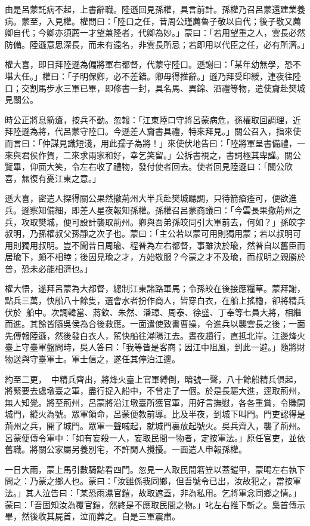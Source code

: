 由是呂蒙託病不起，上書辭職。陸遜回見孫權，具言前計。孫權乃召呂蒙還建業養病。蒙至，入見權。權問曰：「陸口之任，昔周公瑾薦魯子敬以自代；後子敬又薦卿自代；今卿亦須薦一才望兼隆者，代卿為妙。」蒙曰：「若用望重之人，雲長必然防備。陸遜意思深長，而未有遠名，非雲長所忌；若即用以代臣之任，必有所濟。」

權大喜，即日拜陸遜為偏將軍右都督，代蒙守陸口。遜謝曰：「某年幼無學，恐不堪大任。」權曰：「子明保卿，必不差錯。卿毋得推辭。」遜乃拜受印綬，連夜往陸口；交割馬步水三軍已畢，即修書一封，具名馬、異錦、酒禮等物，遣使齎赴樊城見關公。

時公正將息箭瘡，按兵不動。忽報：「江東陸口守將呂蒙病危，孫權取回調理，近拜陸遜為將，代呂蒙守陸口。今遜差人齎書具禮，特來拜見。」關公召入，指來使而言曰：「仲謀見識短淺，用此孺子為將！」來使伏地告曰：「陸將軍呈書備禮，一來與君侯作賀，二來求兩家和好，幸乞笑留。」公拆書視之，書詞極其卑謹。關公覽畢，仰面大笑，令左右收了禮物，發付使者回去。使者回見陸遜曰：「關公欣喜，無復有憂江東之意。」

遜大喜，密遣人探得關公果然撤荊州大半兵赴樊城聽調，只待箭瘡痊可，便欲進兵。遜察知備細，即差人星夜報知孫權。孫權召呂蒙商議曰：「今雲長果撤荊州之兵，攻取樊城，便可設計襲取荊州。卿與吾弟孫皎同引大軍前去，何如？」孫皎字叔明，乃孫權叔父孫靜之次子也。蒙曰：「主公若以蒙可用則獨用蒙；若以叔明可用則獨用叔明。豈不聞昔日周瑜、程普為左右都督，事雖決於瑜，然普自以舊臣而居瑜下，頗不相睦；後因見瑜之才，方始敬服？今蒙之才不及瑜，而叔明之親勝於普，恐未必能相濟也。」

權大悟，遂拜呂蒙為大都督，總制江東諸路軍馬；令孫皎在後接應糧草。蒙拜謝，點兵三萬，快船八十餘隻，選會水者扮作商人，皆穿白衣，在船上搖櫓，卻將精兵伏於𦩷𦪇船中。次調韓當、蔣欽、朱然、潘璋、周泰、徐盛、丁奉等七員大將，相繼而進。其餘皆隨吳侯為合後救應。一面遣使致書曹操，令進兵以襲雲長之後；一面先傳報陸遜，然後發白衣人，駕快船往潯陽江去。晝夜趲行，直抵北岸。江邊烽火臺上守臺軍盤問時，吳人答曰：「我等皆是客商；因江中阻風，到此一避。」隨將財物送與守臺軍士。軍士信之，遂任其停泊江邊。

約至二更，𦩷𦪇中精兵齊出，將烽火臺上官軍縛倒，暗號一聲，八十餘船精兵俱起，將緊要去處墩臺之軍，盡行捉入船中，不曾走了一個。於是長驅大進，逕取荊州，無人知覺。將至荊州，呂蒙將沿江墩臺所獲官軍，用好言撫慰，各各重賞，令賺開城門，縱火為號。眾軍領命，呂蒙便教前導。比及半夜，到城下叫門。門吏認得是荊州之兵，開了城門。眾軍一聲喊起，就城門裏放起號火。吳兵齊入，襲了荊州。呂蒙便傳令軍中：「如有妄殺一人，妄取民間一物者，定按軍法。」原任官吏，並依舊職。將關公家屬另養別宅，不許閒人攪擾。一面遣人申報孫權。

一日大雨，蒙上馬引數騎點看四門。忽見一人取民間箬笠以蓋鎧甲，蒙喝左右執下問之：乃蒙之鄉人也。蒙曰：「汝雖係我同鄉，但吾號令已出，汝故犯之，當按軍法。」其人泣告曰：「某恐雨濕官鎧，故取遮蓋，非為私用。乞將軍念同鄉之情。」蒙曰：「吾固知汝為覆官鎧，然終是不應取民間之物。」叱左右推下斬之。梟首傳示畢，然後收其屍首，泣而葬之。自是三軍震肅。

